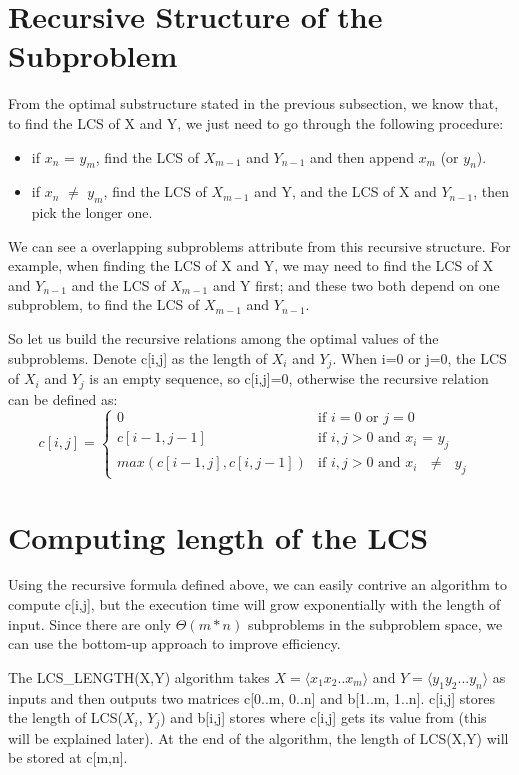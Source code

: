 \documentclass{report}
\begin{document}
    \section{Recursive Structure of the Subproblem}
    From the optimal substructure stated in the previous subsection, we know that, to find the LCS of X and Y, we just need to go through the following procedure:
    \begin{itemize}
        \item if $x_n$ = $y_m$, find the LCS of $X_{m-1}$ and $Y_{n-1}$ and then append $x_m$ (or $y_n$).
        \item if $x_n$ $\neq$ $y_m$, find the LCS of $X_{m-1}$ and Y, and the LCS of X and $Y_{n-1}$, then pick the longer one.
    \end{itemize}
    
    We can see a overlapping subproblems attribute from this recursive structure. For example, when finding the LCS of X and Y, we may need to find the LCS of X and $Y_{n-1}$ and the LCS of $X_{m-1}$ and Y first; and these two both depend on one subproblem, to find the LCS of $X_{m-1}$ and $Y_{n-1}$.
    
    So let us build the recursive relations among the optimal values of the subproblems.
    Denote c[i,j] as the length of $X_i$ and $Y_j$. When i=0 or j=0, the LCS of $X_i$ and $Y_j$ is an empty sequence, so c[i,j]=0, otherwise the recursive relation can be defined as:
        \[ c[i,j] =  \begin{cases} 
          0 &  \text{if $i=0$ or $j=0$}   \\
          c[i-1, j-1] & \text{if $i,j > 0$ and $x_i$ = $y_j$ } \\
          max(c[i-1, j], c[i, j-1]) & \text{if $i,j > 0$ and $x_i$  $\neq$ $y_j$ } 
       \end{cases} \]
    
    \section{Computing length of the LCS}
    Using the recursive formula defined above, we can easily contrive an algorithm to compute c[i,j], but the execution time will grow exponentially with the length of input. Since there are only $\Theta(m*n)$ subproblems in the subproblem space, we can use the bottom-up approach to improve efficiency.
    
    \bigskip
    The LCS\_LENGTH(X,Y) algorithm takes $X=\langle x_1x_2..x_m\rangle$ and $Y = \langle y_1y_2...y_n\rangle$ as inputs and then outputs two matrices c[0..m, 0..n] and b[1..m, 1..n]. c[i,j] stores the length of LCS($X_i$, $Y_j$) and b[i,j] stores where c[i,j] gets its value from (this will be explained later). At the end of the algorithm, the length of LCS(X,Y) will be stored at c[m,n].
    
\end{document}
